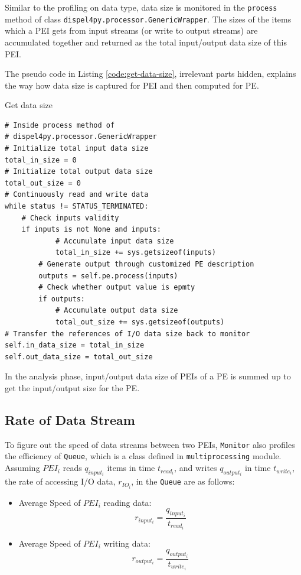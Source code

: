 \documentclass[10pt,twoside,openright,logo]{report}
\begin{document}
Similar to the profiling on data type, data size is monitored in the \texttt{process} method of class \texttt{dispel4py.processor.GenericWrapper}. The sizes of the items which a PEI gets from input streams (or write to output streams) are accumulated together and returned as the total input/output data size of this PEI.

The pseudo code in Listing \ref{code:get-data-size}, irrelevant parts hidden, explains the way how data size is captured for PEI and then computed for PE.
\begin{listing}
\caption{Get data size}
\label{code:get-data-size}
\begin{verbatim}
# Inside process method of
# dispel4py.processor.GenericWrapper
# Initialize total input data size
total_in_size = 0
# Initialize total output data size
total_out_size = 0
# Continuously read and write data
while status != STATUS_TERMINATED:
    # Check inputs validity
    if inputs is not None and inputs:
            # Accumulate input data size
            total_in_size += sys.getsizeof(inputs)
        # Generate output through customized PE description
        outputs = self.pe.process(inputs)
        # Check whether output value is epmty
        if outputs:
            # Accumulate output data size
            total_out_size += sys.getsizeof(outputs)
# Transfer the references of I/O data size back to monitor
self.in_data_size = total_in_size
self.out_data_size = total_out_size
\end{verbatim}
\end{listing}

In the analysis phase, input/output data size of PEIs of a PE is summed up to get the input/output size for the PE.

\subsection{Rate of Data Stream}
To figure out the speed of data streams between two PEIs, \texttt{Monitor} also profiles the efficiency of \texttt{Queue}, which is a class defined in \texttt{multiprocessing} module.
Assuming $PEI_i$ reads $q_{input_i}$ items in time $t_{read_i}$, and writes $q_{output_i}$ in time $t_{write_i}$, the rate of accessing I/O data, $r_{IO_i}$, in the \texttt{Queue} are as follows:

\begin{itemize}
    \item Average Speed of $PEI_i$ reading data:
        $$r_{input_i}= \frac{q_{input_i}}{t_{read_i}}$$
    \item Average Speed of $PEI_i$ writing data:
        $$r_{output_i}= \frac{q_{output_i}}{t_{write_i}}$$
\end{itemize}
\end{document}
